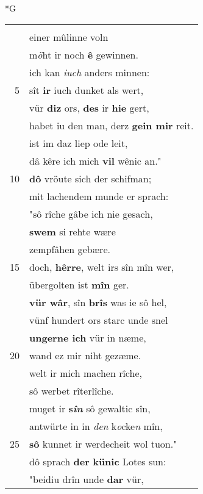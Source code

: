 \documentclass[8pt,a4paper,notitlepage]{article}
\begin{document}
\begin{table}[ht]
\begin{minipage}[t]{0.5\linewidth}
\small
\begin{center}*G
\end{center}
\begin{tabular}{rl}
 & \textbf{\begin{large}E\end{large}ine wîle het mirz} verstoln.\\ 
 & einer mûlinne voln\\ 
 & m\textit{ö}ht ir noch \textbf{ê} gewinnen.\\ 
 & ich kan \textit{iuch} anders minnen:\\ 
5 & sît \textbf{ir} iuch dunket als wert,\\ 
 & vür \textbf{diz} ors, \textbf{des} ir \textbf{hie} gert,\\ 
 & habet iu den man, derz \textbf{gein mir} reit.\\ 
 & ist im daz liep ode leit,\\ 
 & dâ kêre ich mich \textbf{vil} wênic an."\\ 
10 & \textbf{dô} vröute sich der schifman;\\ 
 & mit lachendem munde er sprach:\\ 
 & "sô rîche gâbe ich nie gesach,\\ 
 & \textbf{swem} si rehte wære\\ 
 & zempfâhen gebære.\\ 
15 & doch, \textbf{hêrre}, welt irs sîn mîn wer,\\ 
 & übergolten ist \textbf{mîn} ger.\\ 
 & \textbf{vür wâr}, sîn \textbf{brîs} was ie sô hel,\\ 
 & vünf hundert ors starc unde snel\\ 
 & \textbf{ungerne ich} vür in næme,\\ 
20 & wand ez mir niht gezæme.\\ 
 & welt ir mich machen rîche,\\ 
 & sô werbet rîterlîche.\\ 
 & muget ir \textbf{s\textit{în}} sô gewaltic sîn,\\ 
 & antwürte in in \textit{den} k\textit{o}cke\textit{n} mîn,\\ 
25 & \textbf{sô} kunnet ir werdecheit wol tuon."\\ 
 & dô sprach \textbf{der} \textbf{künic} Lotes sun:\\ 
 & "beidiu drîn unde \textbf{dar} vür,\\ 

\end{tabular}
\end{minipage}
\end{table}
\end{document}
